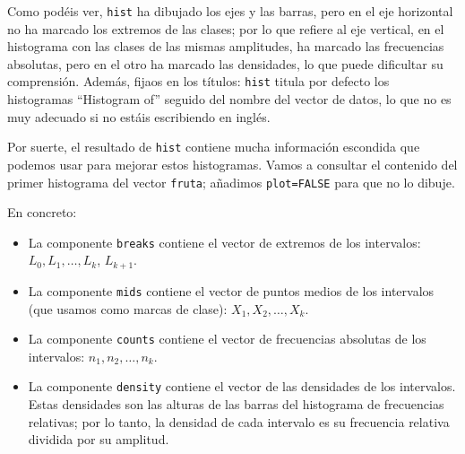 \documentclass[
]{book}
\newenvironment{Shaded}{\begin{snugshade}}{\end{snugshade}}
\newcommand{\CommentTok}[1]{\textcolor[rgb]{0.56,0.35,0.01}{\textit{#1}}}
\newcommand{\DataTypeTok}[1]{\textcolor[rgb]{0.13,0.29,0.53}{#1}}
\newcommand{\KeywordTok}[1]{\textcolor[rgb]{0.13,0.29,0.53}{\textbf{#1}}}
\newcommand{\NormalTok}[1]{#1}
\newcommand{\OtherTok}[1]{\textcolor[rgb]{0.56,0.35,0.01}{#1}}
\theoremstyle{definition}
\theoremstyle{definition}
\theoremstyle{definition}
\theoremstyle{remark}
\begin{document}
Como podéis ver, \texttt{hist} ha dibujado los ejes y las barras, pero en el eje horizontal no ha marcado los extremos de las clases; por lo que refiere al eje vertical, en el histograma con las clases de las mismas amplitudes, ha marcado las frecuencias absolutas, pero en el otro ha marcado las densidades, lo que puede dificultar su comprensión.
Además, fijaos en los títulos: \texttt{hist} titula por defecto los histogramas ``Histogram of'' seguido del nombre del vector de datos, lo que no es muy adecuado si no estáis escribiendo en inglés.

Por suerte, el resultado de \texttt{hist} contiene mucha información escondida que podemos usar para mejorar estos histogramas. Vamos a consultar el contenido del primer histograma del vector \texttt{fruta}; añadimos \texttt{plot=FALSE} para que no lo dibuje.

\begin{Shaded}
\end{Shaded}

En concreto:

\begin{itemize}
\item
  La componente \texttt{breaks} contiene el vector de extremos de los intervalos: \(L_0,L_1,\ldots,L_k\), \(L_{k+1}\).
\item
  La componente \texttt{mids} contiene el vector de puntos medios de los intervalos (que usamos como marcas de clase): \(X_1,X_2, \ldots,X_k\).
\item
  La componente \texttt{counts} contiene el vector de frecuencias absolutas de los intervalos: \(n_1,n_2,\ldots,n_k\).
\item
  La componente \texttt{density} contiene el vector de las densidades de los intervalos. Estas densidades son las alturas de las barras del histograma de frecuencias relativas; por lo tanto, la densidad de cada intervalo es su frecuencia relativa dividida por su amplitud.
\end{itemize}
\end{document}

